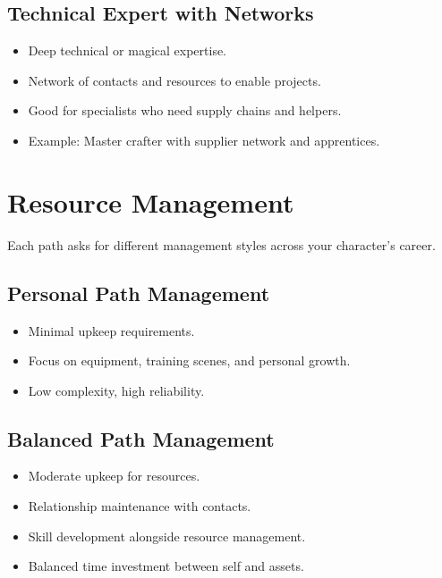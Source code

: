 \subsection*{Technical Expert with Networks}
\begin{itemize}
\item Deep technical or magical expertise.
\item Network of contacts and resources to enable projects.
\item Good for specialists who need supply chains and helpers.
\item Example: Master crafter with supplier network and apprentices.
\end{itemize}


\section{Resource Management}
\label{sec:xp-resource-mgmt}

Each path asks for different management styles across your character's career.

\subsection*{Personal Path Management}
\begin{itemize}
\item Minimal upkeep requirements.
\item Focus on equipment, training scenes, and personal growth.
\item Low complexity, high reliability.
\end{itemize}

\subsection*{Balanced Path Management}
\begin{itemize}
\item Moderate upkeep for resources.
\item Relationship maintenance with contacts.
\item Skill development alongside resource management.
\item Balanced time investment between self and assets.
\end{itemize}

